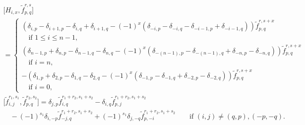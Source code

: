 \documentclass[pdftex]{sigma}
\numberwithin{equation}{section}
\theoremstyle{definition}
\begin{document}
\begin{gather*}
\bigl[H_{i,x},\widetilde{f}_{p,q}^{r,s}\bigr]\nonumber\\
=\begin{cases}
(\delta_{i,p}-\delta_{i+1,p}-\delta_{i,q}+\delta_{i+1,q}-(-1)^x(\delta_{-i,p}-\delta_{-i,q}-\delta_{-i-1,p}+\delta_{-i-1,q}))\widetilde{f}_{p,q}^{r,s+x}\\
\quad \text{if }1\leq i\leq n-1,\\
(\delta_{n-1,p}+\delta_{n,p}-\delta_{n-1,q}-\delta_{n,q}-(-1)^x(\delta_{-(n-1),p}-\delta_{-(n-1),q}+\delta_{-n,p}-\delta_{-n,q}))\widetilde{f}_{p,q}^{r,s+x}\\
\quad \text{if }i=n,\\
-(\delta_{1,p}+\delta_{2,p}-\delta_{1,q}-\delta_{2,q}-(-1)^x(\delta_{-1,p}-\delta_{-1,q}+\delta_{-2,p}-\delta_{-2,q}))\widetilde{f}_{p,q}^{r,s+x}\\
\quad \text{if }i=0,
\end{cases}\\
\bigl[\widetilde{f}_{i,j}^{r_1,s_1},\widetilde{f}_{p,q}^{r_2,s_2}\bigr]
=\delta_{j,p}\widetilde{f}_{i,q}^{r_1+r_2,s_1+s_2}-\delta_{i,q}\widetilde{f}_{p,j}^{r_1+r_2,s_1+s_2}\nonumber\\
\quad{}
-(-1)^{s_1}\delta_{i,-p}\widetilde{f}_{-j,q}^{r_1+r_2,s_1+s_2}+(-1)^{s_1}\delta_{j,-q}\widetilde{f}_{p,-i}^{r_1+r_2,s_1+s_2}\qquad \text{if }(i,j)\neq(q,p),(-p,-q).
\end{gather*}
\end{document}
